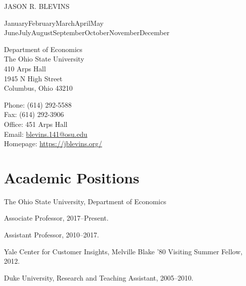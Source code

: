 \documentclass[10pt,letterpaper]{article}
\def\name{Jason R. Blevins}
\newcommand{\titlefont}[1]{{\titleface\large\MakeUppercase{#1}}}
\renewenvironment{itemize}{
  \begin{list}{}{
      \setlength{\leftmargin}{1.5em}
      \setlength{\itemsep}{0.25em}
      \setlength{\parskip}{0pt}
      \setlength{\parsep}{0.25em}
    }
}{
  \end{list}
}
\renewcommand{\today}{\ifcase \month \or January\or February\or March\or April\or May%
\or June\or July\or August\or September\or October\or November\or December\fi%
\space \number \year}
\begin{document}
\titlefont{\name}


\bigskip
\today

\bigskip
\begin{minipage}[t]{0.495\textwidth}
  Department of Economics \\
  The Ohio State University \\
  410 Arps Hall \\
  1945 N High Street \\
  Columbus, Ohio 43210
\end{minipage}
\begin{minipage}[t]{0.495\textwidth}
  Phone: (614) 292-5588 \\
  Fax: (614) 292-3906 \\
  Office: 451 Arps Hall \\
  Email: \href{mailto:blevins.141@osu.edu}{blevins.141@osu.edu} \\
  Homepage: \href{https://jblevins.org/}{https://jblevins.org/}
\end{minipage}

\section*{Academic Positions}

\begin{itemize}
\item The Ohio State University, Department of Economics
  \begin{itemize}
  \item Associate Professor, 2017--Present.
  \item Assistant Professor, 2010--2017.
  \end{itemize}
\item Yale Center for Customer Insights,
  Melville Blake '80 Visiting Summer Fellow,
  2012.
\item Duke University,
  Research and Teaching Assistant,
  2005--2010.
\end{itemize}
\end{document}
